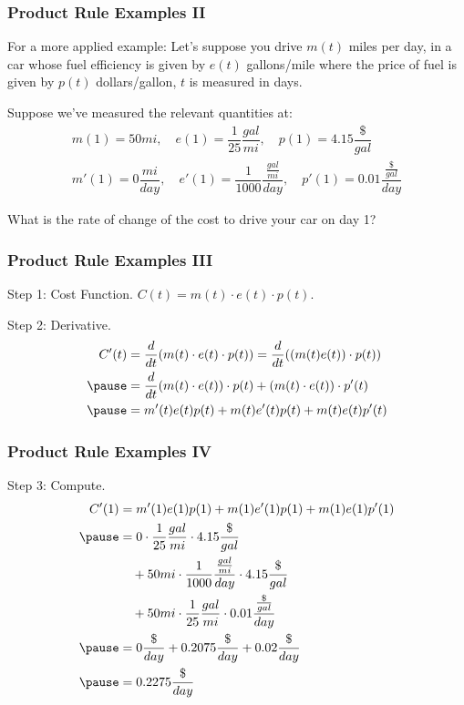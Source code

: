 \documentclass{ltx-talk}
\begin{document}
\begin{frame}
  \frametitle{Product Rule Examples II}
  For a more applied example: \pause
  Let's suppose you drive $m(t)$ miles per day,
  in a car whose fuel efficiency is given by $e(t)$ gallons/mile
  where the price of fuel is given by $p(t)$ dollars/gallon,
  $t$ is measured in days. \pause

  Suppose we've measured the relevant quantities at:
  \begin{gather}
    m(1) = 50 mi, \quad e(1) = \dfrac{1}{25} \dfrac{gal}{mi}, \quad p(1) = 4.15 \dfrac{\$}{gal} \\
    m'(1) = 0 \dfrac{mi}{day}, \quad e'(1) = \dfrac{1}{1000} \dfrac{\frac{gal}{mi}}{day}, \quad p'(1) = 0.01 \dfrac{\frac{\$}{gal}}{day}
  \end{gather} \pause

  What is the rate of change of the cost to drive your car on day 1? \pause
\end{frame}
\begin{frame}
  \frametitle{Product Rule Examples III}
  Step 1: Cost Function. \pause $C(t) = m(t) \cdot e(t) \cdot p(t)$. \pause

  Step 2: Derivative. \pause
  \begin{align}
    C'(t) &= \dfrac{d}{dt}(m(t) \cdot e(t) \cdot p(t)) = \dfrac{d}{dt} ((m(t)e(t)) \cdot p(t)) \\ \pause
          &= \dfrac{d}{dt}(m(t) \cdot e(t)) \cdot p(t) + (m(t) \cdot e(t)) \cdot p'(t) \\ \pause
          &= m'(t) e(t) p(t) + m(t) e'(t) p(t) + m(t) e(t) p'(t)
  \end{align} \pause
\end{frame}
\begin{frame}
  \frametitle{Product Rule Examples IV}
  Step 3: Compute. \pause
  \begin{align}
    C'(1) &= m'(1) e(1) p(1) + m(1) e'(1) p(1) + m(1) e(1) p'(1) \\ \pause
          &= 0 \cdot \dfrac{1}{25} \dfrac{gal}{mi} \cdot 4.15 \dfrac{\$}{gal} \\
          &\quad+ 50 mi \cdot \dfrac{1}{1000} \dfrac{\frac{gal}{mi}}{day} \cdot 4.15 \dfrac{\$}{gal} \\
          &\quad+ 50 mi \cdot \dfrac{1}{25} \dfrac{gal}{mi} \cdot 0.01 \dfrac{\frac{\$}{gal}}{day} \\ \pause
          &= 0 \dfrac{\$}{day} + 0.2075 \dfrac{\$}{day} + 0.02 \dfrac{\$}{day} \\ \pause
          &= 0.2275 \dfrac{\$}{day}
  \end{align}
\end{frame}
\end{document}
